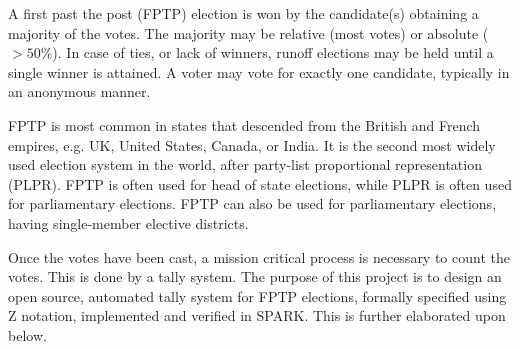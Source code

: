 \documentclass[a4paper]{article}
\begin{document}
\maketitle
\thispagestyle{first} %

A first past the post (FPTP) election is won by the candidate(s) obtaining a
majority of the votes. The majority may be relative (most votes) or absolute
($> 50\%$). In case of ties, or lack of winners, runoff elections may be held
until a single winner is attained. A voter may vote for exactly one candidate,
typically in an anonymous manner.

FPTP is most common in states that descended from the British and French
empires, e.g. UK, United States, Canada, or India. It is the second most widely
used election system in the world, after party-list proportional representation
(PLPR). FPTP is often used for head of state elections, while PLPR is often
used for parliamentary elections. FPTP can also be used for parliamentary
elections, having single-member elective districts.

Once the votes have been cast, a mission critical process is necessary to count
the votes. This is done by a tally system. The purpose of this project is to
design an open source, automated tally system for FPTP elections, formally
specified using Z notation, implemented and verified in SPARK. This is further
elaborated upon below.










\end{document}
